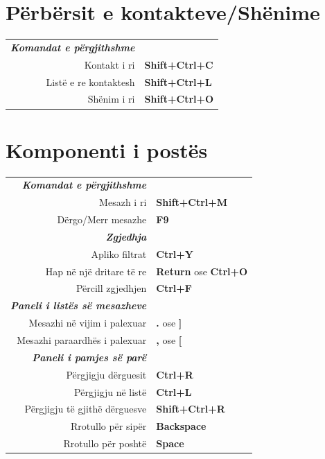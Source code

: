 \documentclass[12pt]{article}
\begin{document}
\begin{landscape}
\begin{center}
\begin{multicols}{2}
	\section*{Përbërsit e kontakteve/Shënime}
	\begin{tabular*}{4in}{rp{1.5in}}
		\textit{\textbf{Komandat e përgjithshme}}	&					\\
		Kontakt i ri				& \textbf{Shift+Ctrl+C}			\\
		Listë e re kontaktesh			& \textbf{Shift+Ctrl+L}			\\
		Shënim i ri				& \textbf{Shift+Ctrl+O}			\\
	\end{tabular*}
	\section*{Komponenti i postës}
	\begin{tabular*}{4in}{rp{1.5in}}
		\textit{\textbf{Komandat e përgjithshme}}	&					\\
		Mesazh i ri				& \textbf{Shift+Ctrl+M}			\\
		\vspace{1.5mm}
		Dërgo/Merr mesazhe			& \textbf{F9}				\\
		\textit{\textbf{Zgjedhja}}		&					\\
		Apliko filtrat				& \textbf{Ctrl+Y}			\\
		Hap në një dritare të re 			& \textbf{Return} ose \textbf{Ctrl+O}	\\
		\vspace{1.5mm}
		Përcill zgjedhjen			& \textbf{Ctrl+F}			\\
		\textit{\textbf{Paneli i listës së mesazheve}}	&					\\
		Mesazhi në vijim i palexuar			& \textbf{.} ose \textbf{]}		\\
		\vspace{1.5mm}
		Mesazhi paraardhës i palexuar			& \textbf{,} ose \textbf{[}		\\
		\textit{\textbf{Paneli i pamjes së parë}}		&					\\
		Përgjigju dërguesit				& \textbf{Ctrl+R}			\\
		Përgjigju në listë				& \textbf{Ctrl+L}			\\
		Përgjigju të gjithë dërguesve 		& \textbf{Shift+Ctrl+R}			\\
		Rrotullo për sipër				& \textbf{Backspace}			\\
		Rrotullo për poshtë				& \textbf{Space}			\\
	\end{tabular*}

\end{multicols}
\end{center}
\end{landscape}
\end{document}
